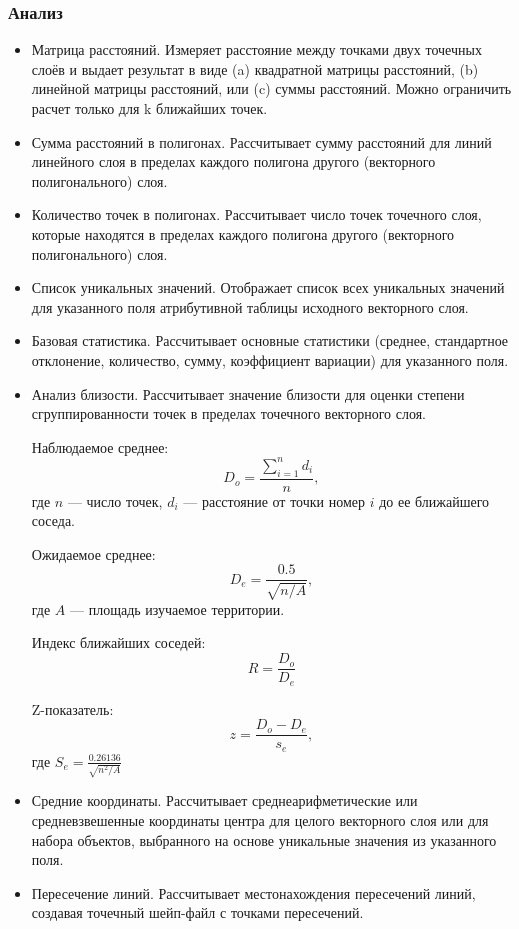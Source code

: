 
\begin{frame}[allowframebreaks]
    \frametitle{Анализ}
    \begin{itemize}
        \item Матрица расстояний. Измеряет расстояние между точками двух точечных слоёв и выдает результат в виде (a) квадратной матрицы расстояний, (b) линейной матрицы расстояний, или (c) суммы расстояний. Можно ограничить расчет только для k ближайших точек.
        \item Сумма расстояний в полигонах. Рассчитывает сумму расстояний для линий линейного слоя в пределах каждого полигона другого (векторного полигонального) слоя.
        \item Количество точек в полигонах. Рассчитывает число точек точечного слоя, которые находятся в пределах каждого полигона другого (векторного полигонального) слоя.
        \item Список уникальных значений. Отображает список всех уникальных значений для указанного поля атрибутивной таблицы исходного векторного слоя.
        \item Базовая статистика. Рассчитывает основные статистики (среднее, стандартное отклонение, количество, сумму, коэффициент вариации) для указанного поля.
        \item Анализ близости. Рассчитывает значение близости для оценки степени сгруппированности точек в пределах точечного векторного слоя.

        Наблюдаемое среднее:
        \begin{equation*}
            D_o = \frac{\sum_{i=1}^n d_i}{n},
        \end{equation*}
        где $n$ --- число точек, $d_i$ --- расстояние от точки номер $i$ до ее ближайшего соседа.


        Ожидаемое среднее:
        \begin{equation*}
            D_e = \frac{0.5}{\sqrt{n/A}},
        \end{equation*}
        где $A$ --- площадь изучаемое территории.

        Индекс ближайших соседей:
        \begin{equation*}
            R = \frac{D_o}{D_e}
        \end{equation*}

        Z-показатель:
        \begin{equation*}
            z = \frac{D_o-D_e}{s_e},
        \end{equation*}
        где $S_e = \frac{0.26136}{\sqrt{n^2/A}}$

        \item Средние координаты. Рассчитывает среднеарифметические или средневзвешенные координаты центра для целого векторного слоя или для набора объектов, выбранного на основе уникальные значения из указанного поля.
        \item Пересечение линий. Рассчитывает местонахождения пересечений линий, создавая точечный шейп-файл с точками пересечений.
    \end{itemize}
\end{frame}


